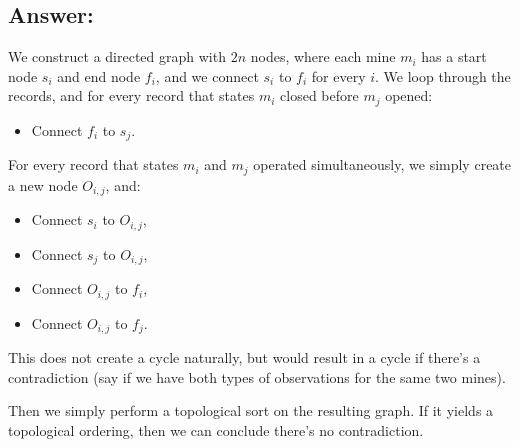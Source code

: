 \documentclass[12pt, letterpaper]{article}
\begin{document}
\subsection*{Answer:}
We construct a directed graph with $2n$ nodes, where each mine $m_i$ has a start node $s_i$ and end node $f_i$, and we connect $s_i$ to $f_i$ for every $i$.
We loop through the records, and 
for every record that states $m_i$ closed before $m_j$ opened:
\begin{itemize}
    \item Connect $f_i$ to $s_j$.
\end{itemize}
For every record that states $m_i$ and $m_j$ operated simultaneously, we simply create a new node $O_{i,j}$, and:
\begin{itemize}
    \item Connect $s_i$ to $O_{i,j}$,
    \item Connect $s_j$ to $O_{i,j}$,
    \item Connect $O_{i,j}$ to $f_i$,
    \item Connect $O_{i,j}$ to $f_j$.
\end{itemize}
This does not create a cycle naturally, but would result in a cycle if there's a contradiction (say if we have both types of observations for the same two mines).

Then we simply perform a topological sort on the resulting graph. If it yields a topological ordering, then we can conclude there's no contradiction.
\end{document}
